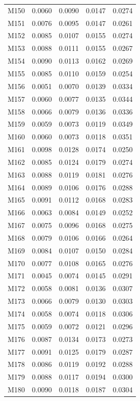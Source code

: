 \begin{longtable}{lrrrr}
M150 & 0.0060 & 0.0090 & 0.0147 & 0.0274 \\
M151 & 0.0076 & 0.0095 & 0.0147 & 0.0261 \\
M152 & 0.0085 & 0.0107 & 0.0155 & 0.0274 \\
M153 & 0.0088 & 0.0111 & 0.0155 & 0.0267 \\
M154 & 0.0090 & 0.0113 & 0.0162 & 0.0269 \\
M155 & 0.0085 & 0.0110 & 0.0159 & 0.0254 \\
M156 & 0.0051 & 0.0070 & 0.0139 & 0.0334 \\
M157 & 0.0060 & 0.0077 & 0.0135 & 0.0344 \\
M158 & 0.0066 & 0.0079 & 0.0136 & 0.0336 \\
M159 & 0.0059 & 0.0073 & 0.0119 & 0.0349 \\
M160 & 0.0060 & 0.0073 & 0.0118 & 0.0351 \\
M161 & 0.0098 & 0.0128 & 0.0174 & 0.0250 \\
M162 & 0.0085 & 0.0124 & 0.0179 & 0.0274 \\
M163 & 0.0088 & 0.0119 & 0.0181 & 0.0276 \\
M164 & 0.0089 & 0.0106 & 0.0176 & 0.0288 \\
M165 & 0.0091 & 0.0112 & 0.0168 & 0.0283 \\
M166 & 0.0063 & 0.0084 & 0.0149 & 0.0252 \\
M167 & 0.0075 & 0.0096 & 0.0168 & 0.0275 \\
M168 & 0.0079 & 0.0106 & 0.0166 & 0.0264 \\
M169 & 0.0084 & 0.0107 & 0.0150 & 0.0284 \\
M170 & 0.0077 & 0.0108 & 0.0165 & 0.0276 \\
M171 & 0.0045 & 0.0074 & 0.0145 & 0.0291 \\
M172 & 0.0058 & 0.0081 & 0.0136 & 0.0307 \\
M173 & 0.0066 & 0.0079 & 0.0130 & 0.0303 \\
M174 & 0.0058 & 0.0074 & 0.0118 & 0.0306 \\
M175 & 0.0059 & 0.0072 & 0.0121 & 0.0296 \\
M176 & 0.0087 & 0.0134 & 0.0173 & 0.0273 \\
M177 & 0.0091 & 0.0125 & 0.0179 & 0.0287 \\
M178 & 0.0086 & 0.0119 & 0.0192 & 0.0288 \\
M179 & 0.0088 & 0.0117 & 0.0194 & 0.0300 \\
M180 & 0.0090 & 0.0118 & 0.0187 & 0.0304 \\

\end{longtable}

